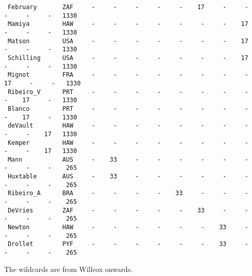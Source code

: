 \documentclass[12pt]{article}
\begin{document}
{\begin{verbatim}
 February       ZAF     -     -     -     -     -    17     -     -     -     -     -   1330
 Mamiya         HAW     -     -     -     -     -     -     -    17     -     -     -   1330
 Matson         USA     -     -     -     -     -     -     -    17     -     -     -   1330
 Schilling      USA     -     -     -     -     -     -     -    17     -     -     -   1330
 Mignot         FRA     -     -     -     -     -     -     -     -    17     -     -   1330
 Ribeiro_V      PRT     -     -     -     -     -     -     -     -     -    17     -   1330
 Blanco         PRT     -     -     -     -     -     -     -     -     -    17     -   1330
 deVault        HAW     -     -     -     -     -     -     -     -     -     -    17   1330
 Kemper         HAW     -     -     -     -     -     -     -     -     -     -    17   1330
 Mann           AUS     -    33     -     -     -     -     -     -     -     -     -    265
 Huxtable       AUS     -    33     -     -     -     -     -     -     -     -     -    265
 Ribeiro_A      BRA     -     -     -     -    33     -     -     -     -     -     -    265
 DeVries        ZAF     -     -     -     -     -    33     -     -     -     -     -    265
 Newton         HAW     -     -     -     -     -     -    33     -     -     -     -    265
 Drollet        PYF     -     -     -     -     -     -    33     -     -     -     -    265
\end{verbatim}
}
The wildcards are from Willcox onwards.
\end{document}
